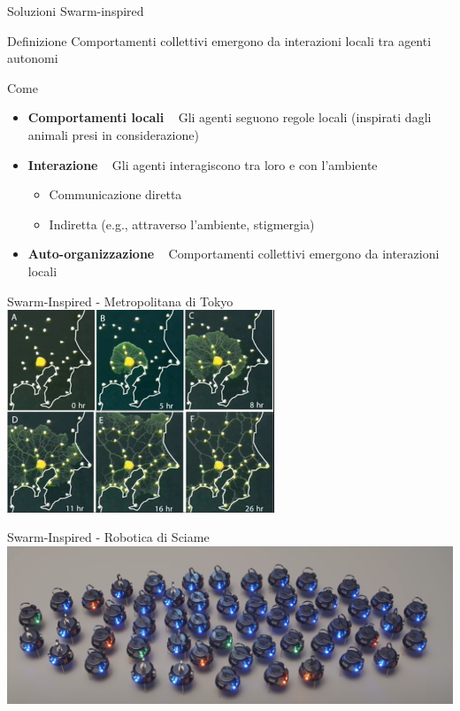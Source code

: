\documentclass[presentation, 10pt,aspectratio=169]{beamer}\mode<presentation>{\usetheme{AMSBolognaFC}}
\begin{document}
\begin{frame}{Soluzioni Swarm-inspired}
	\begin{exampleblock}{Definizione}
		Comportamenti collettivi emergono da interazioni locali tra agenti autonomi
	\end{exampleblock}
	\begin{block}{Come}
		\begin{itemize}
			\item \textbf{Comportamenti locali} \faArrowRight ~ Gli agenti seguono regole locali (inspirati dagli animali presi in considerazione)
			\item \textbf{Interazione} \faArrowRight ~ Gli agenti interagiscono tra loro e con l'ambiente
			\begin{itemize}
				\item Communicazione diretta 
				\item Indiretta (e.g., attraverso l'ambiente, stigmergia)
			\end{itemize}
			\item \textbf{Auto-organizzazione} \faArrowRight ~ Comportamenti collettivi emergono da interazioni locali
		\end{itemize}
	\end{block}
\end{frame}
\begin{frame}{Swarm-Inspired - Metropolitana di Tokyo}
	\centering
	\includegraphics[width=0.6\textwidth]{img/metro-tokyo.png}
\end{frame}
\begin{frame}{Swarm-Inspired - Robotica di Sciame}
	\centering
	\includegraphics[width=\textwidth]{img/kilobot.png}
\end{frame}
\end{document}
